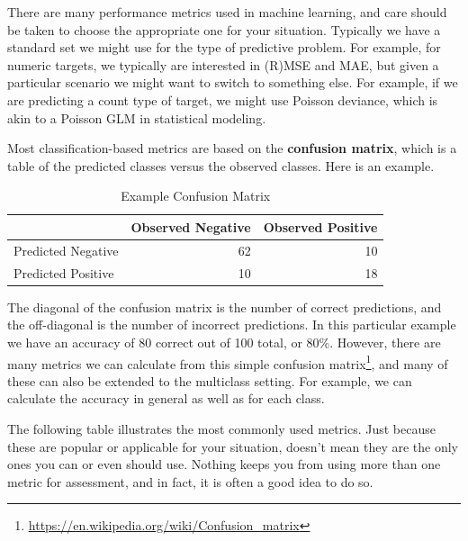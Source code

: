 \documentclass[
  letterpaper,
]{krantz}
\DeclareRobustCommand{\href}[2]{#2\footnote{\url{#1}}}
\begin{document}
There are many performance metrics used in machine learning, and care
should be taken to choose the appropriate one for your situation.
Typically we have a standard set we might use for the type of predictive
problem. For example, for numeric targets, we typically are interested
in (R)MSE and MAE, but given a particular scenario we might want to
switch to something else. For example, if we are predicting a count type
of target, we might use Poisson deviance, which is akin to a Poisson GLM
in statistical modeling.

Most classification-based metrics are based on the \textbf{confusion
matrix}, which is a table of the predicted classes versus the observed
classes. Here is an example.

\begin{longtable}{lrr}
\caption{Example Confusion Matrix}\tabularnewline

\toprule
  & Observed Negative & Observed Positive \\ 
\midrule\addlinespace[2.5pt]
Predicted Negative & 62 & 10 \\ 
Predicted Positive & 10 & 18 \\ 
\bottomrule
\end{longtable}

The diagonal of the confusion matrix is the number of correct
predictions, and the off-diagonal is the number of incorrect
predictions. In this particular example we have an accuracy of 80
correct out of 100 total, or 80\%. However, there are
\href{https://en.wikipedia.org/wiki/Confusion_matrix}{many metrics we
can calculate from this simple confusion matrix}, and many of these can
also be extended to the multiclass setting. For example, we can
calculate the accuracy in general as well as for each class.

The following table illustrates the most commonly used metrics. Just
because these are popular or applicable for your situation, doesn't mean
they are the only ones you can or even should use. Nothing keeps you
from using more than one metric for assessment, and in fact, it is often
a good idea to do so.
\end{document}
